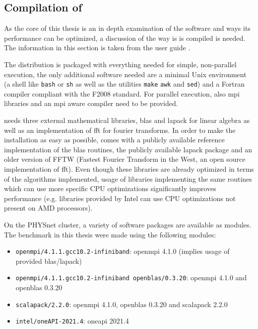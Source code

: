 \documentclass[main.tex]{subfiles}
\begin{document}
\subsection{Compilation of \QE}\label{sub:qe_compilation}

As the core of this thesis is an in depth examination of the \QE software and ways its performance can be optimized, a discussion of the way is is compiled is needed.
The information in this section is taken from the  user guide \cite{noauthor_quantum_nodate}.

The \QE distribution is packaged with everything needed for simple, non-parallel execution, the only additional software needed are a minimal Unix environment (a shell like \texttt{bash} or \texttt{sh} as well as the utilities \texttt{make} \texttt{awk} and \texttt{sed}) and a Fortran compiler compliant with the F2008 standard.
For parallel execution, also \gls{mpi} libraries and an \gls{mpi} aware compiler need to be provided.

\QE needs three external mathematical libraries, \gls{blas} and \gls{lapack} for linear algebra as well as an implementation of \gls{fft} for fourier transforms.
In order to make the installation as easy as possible, \QE comes with a publicly available reference implementation of the \gls{blas} routines, the publicly available \gls{lapack} package and an older version of FFTW (Fastest Fourier Transform in the West, an open source implementation of \gls{fft}).
Even though these libraries are already optimized in terms of the algorithms implemented, usage of libraries implementing the same routines which can use more specific CPU optimizations significantly improves performance (e.g. libraries provided by Intel can use CPU optimizations not present on AMD processors).

On the PHYSnet cluster, a variety of software packages are available as modules.
The benchmark in this thesis were made using the following modules:
\begin{itemize}
    \item \texttt{openmpi/4.1.1.gcc10.2-infiniband}: \gls{openmpi} 4.1.0 (implies usage of \QE provided \gls{blas}/\gls{lapack})
    \item \texttt{openmpi/4.1.1.gcc10.2-infiniband openblas/0.3.20}: \gls{openmpi} 4.1.0 and \gls{openblas} 0.3.20
    \item \texttt{scalapack/2.2.0}: \gls{openmpi} 4.1.0, \gls{openblas} 0.3.20 and \gls{scalapack} 2.2.0
    \item \texttt{intel/oneAPI-2021.4}: \gls{oneapi} 2021.4
\end{itemize}
\end{document}
